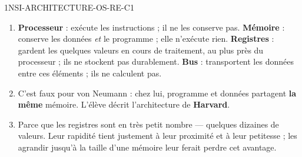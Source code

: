 \begin{corrige}{1NSI-ARCHITECTURE-OS-RE-C1}
\begin{enumerate}
  \item \textbf{Processeur} : exécute les instructions ; il ne les conserve pas.
        \textbf{Mémoire} : conserve les données \emph{et} le programme ; elle n'exécute rien.
        \textbf{Registres} : gardent les quelques valeurs en cours de traitement, au plus près
        du processeur ; ils ne stockent pas durablement.
        \textbf{Bus} : transportent les données entre ces éléments ; ils ne calculent pas.
  \item C'est faux pour von Neumann : chez lui, programme et données partagent \textbf{la même}
        mémoire. L'élève décrit l'architecture de \textbf{Harvard}.
  \item Parce que les registres sont en très petit nombre — quelques dizaines de valeurs. Leur
        rapidité tient justement à leur proximité et à leur petitesse ; les agrandir jusqu'à la
        taille d'une mémoire leur ferait perdre cet avantage.
\end{enumerate}
\end{corrige}
